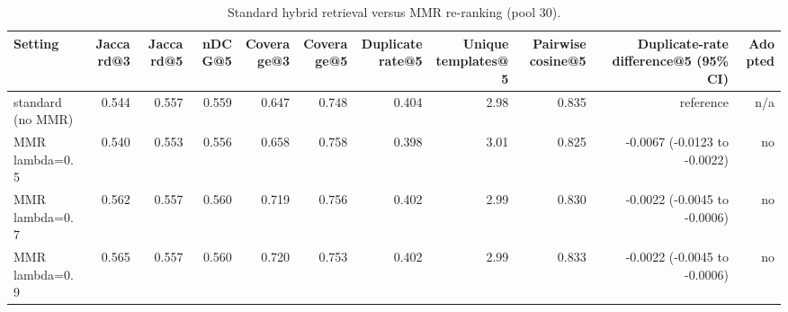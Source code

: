 \begin{table}[t]
\centering
\scriptsize
\begin{tabular}{lrrrrrrrrrr}
\hline
Setting & Jaccard@3 & Jaccard@5 & nDCG@5 & Coverage@3 & Coverage@5 & Duplicate rate@5 & Unique templates@5 & Pairwise cosine@5 & Duplicate-rate difference@5 (95\% CI) & Adopted \\
\hline
standard (no MMR) & 0.544 & 0.557 & 0.559 & 0.647 & 0.748 & 0.404 & 2.98 & 0.835 & reference & n/a \\
MMR lambda=0.5 & 0.540 & 0.553 & 0.556 & 0.658 & 0.758 & 0.398 & 3.01 & 0.825 & -0.0067 (-0.0123 to -0.0022) & no \\
MMR lambda=0.7 & 0.562 & 0.557 & 0.560 & 0.719 & 0.756 & 0.402 & 2.99 & 0.830 & -0.0022 (-0.0045 to -0.0006) & no \\
MMR lambda=0.9 & 0.565 & 0.557 & 0.560 & 0.720 & 0.753 & 0.402 & 2.99 & 0.833 & -0.0022 (-0.0045 to -0.0006) & no \\
\hline
\end{tabular}
\caption{Standard hybrid retrieval versus MMR re-ranking (pool 30).}
\label{tab:table4_diversity_mmr_analysis}
\end{table}

